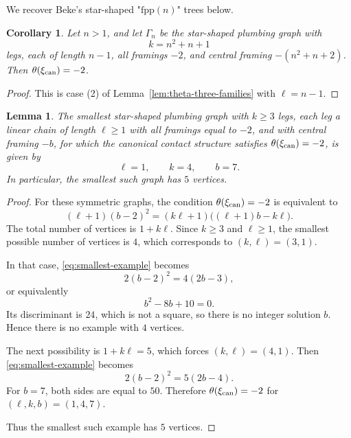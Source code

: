 \documentclass[11pt]{amsart}
\theoremstyle{plain}
\newtheorem{corollary}[theorem]{Corollary}
\newtheorem{lemma}[theorem]{Lemma}
\theoremstyle{definition}
\theoremstyle{remark}
\begin{document}
We recover Beke's star-shaped "$\mathrm{fpp}(n)$" trees \cite[Example~5.1]{Beke25}  below. 

\begin{corollary}
Let $n>1$, and let $\Gamma_n$ be the star-shaped plumbing graph with
\[
k=n^2+n+1
\]
legs, each of length $n-1$, all framings $-2$, and central framing $-(n^2+n+2)$. Then $\theta(\xi_{\rm can})=-2$.
\end{corollary}

\begin{proof}
This is case {\rm (2)} of Lemma~\ref{lem:theta-three-families} with $\ell=n-1$.
\end{proof}

\begin{lemma}
The smallest star-shaped plumbing graph with $k\ge 3$ legs, each leg a linear chain of length $\ell\ge 1$ with all framings equal to $-2$, and with central framing $-b$, for which the canonical contact structure satisfies $\theta(\xi_{\rm can})=-2$, is given by
\[
\ell=1,\qquad k=4,\qquad b=7.
\]
In particular, the smallest such graph has $5$ vertices.
\end{lemma}

\begin{proof}
For these symmetric graphs, the condition $\theta(\xi_{\rm can})=-2$ is equivalent to
\begin{equation}\label{eq:smallest-example}
(\ell+1)(b-2)^2=(k\ell+1)\big((\ell+1)b-k\ell\big).
\end{equation}
The total number of vertices is $1+k\ell$. Since $k\ge 3$ and $\ell\ge 1$, the smallest possible number of vertices is $4$, which corresponds to $(k,\ell)=(3,1)$.

In that case, \eqref{eq:smallest-example} becomes
\[
2(b-2)^2=4(2b-3),
\]
or equivalently
\[
b^2-8b+10=0.
\]
Its discriminant is $24$, which is not a square, so there is no integer solution $b$. Hence there is no example with $4$ vertices.

The next possibility is $1+k\ell=5$, which forces $(k,\ell)=(4,1)$. Then \eqref{eq:smallest-example} becomes
\[
2(b-2)^2=5(2b-4).
\]
For $b=7$, both sides are equal to $50$. Therefore $\theta(\xi_{\rm can})=-2$ for $(\ell,k,b)=(1,4,7)$.

Thus the smallest such example has $5$ vertices.
\end{proof}





\end{document}
